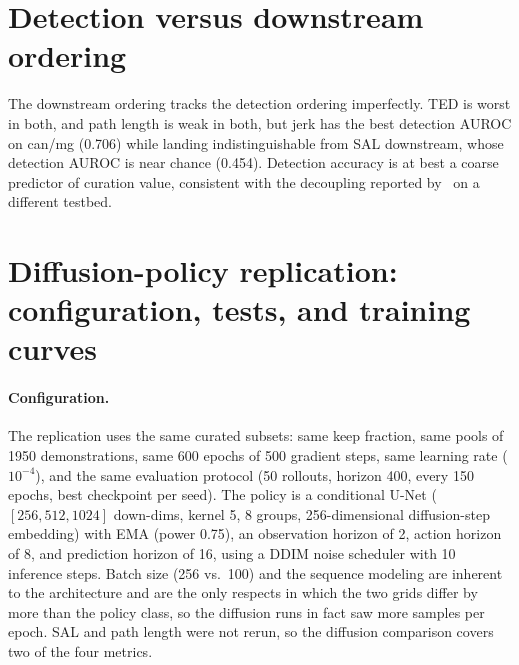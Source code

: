 \documentclass[10pt]{article}
\begin{document}
\section{Detection versus downstream ordering}
\label{app:ordering}

The downstream ordering tracks the detection ordering imperfectly. TED is
worst in both, and path length is weak in both, but jerk has the best
detection AUROC on can/mg (0.706) while landing indistinguishable from SAL
downstream, whose detection AUROC is near chance (0.454). Detection accuracy
is at best a coarse predictor of curation value, consistent with the
decoupling reported by~\citep{bedi-policy} on a different testbed.

\section{Diffusion-policy replication: configuration, tests, and training
curves}
\label{app:dpdetail}

\paragraph{Configuration.} The replication uses the same curated subsets:
same keep fraction, same pools of 1950 demonstrations, same 600 epochs of 500
gradient steps, same learning rate ($10^{-4}$), and the same evaluation
protocol (50 rollouts, horizon 400, every 150 epochs, best checkpoint per
seed). The policy is a conditional U-Net ($[256, 512, 1024]$ down-dims,
kernel 5, 8 groups, 256-dimensional diffusion-step embedding) with EMA
(power 0.75), an observation horizon of 2, action horizon of 8, and
prediction horizon of 16, using a DDIM noise scheduler with 10 inference
steps. Batch size (256 vs.\ 100) and the sequence modeling are inherent to
the architecture and are the only respects in which the two grids differ by
more than the policy class, so the diffusion runs in fact saw more samples
per epoch. SAL and path length were not rerun, so the diffusion comparison
covers two of the four metrics.
\end{document}
